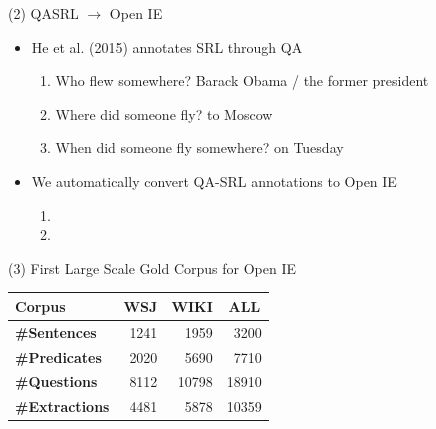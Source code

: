 \documentclass[final]{beamer}
\newcommand{\commonvspace}[0]{\vspace{1cm}}
\begin{document}
\begin{frame}{}
\begin{textblock}{39}
\begin{block}{(2) QASRL $\rightarrow$ Open IE}
  \begin{itemize}
        \setlength\itemsep{1em}
  \item He et al. (2015) annotates \alert{SRL} through QA
    \\ 
    \begin{enumerate}
    \item Who flew somewhere? \alert{Barack Obama} / \alert{the former president}
    \item Where did someone fly?  \alert{to Moscow}
    \item When did someone fly somewhere? \alert{on Tuesday}
    \end{enumerate}
  \item We \alert{automatically} convert QA-SRL annotations to Open IE
    \begin{enumerate}
    \item {}
    \item {}
    \end{enumerate}
  \end{itemize}
\end{block}

\commonvspace
\vspace{1.18cm}

\begin{block}{(3) First Large Scale Gold Corpus for Open IE}
  \begin{table}
    \begin{tabular}{lrrr}
      \hline
      \textbf{Corpus}        & \multicolumn{1}{c}{\textbf{WSJ}} & \multicolumn{1}{c}{\textbf{WIKI}} & \multicolumn{1}{c}{\textbf{ALL}} \\ \hline
      \textbf{\#Sentences}   & 1241                              & 1959                               & 3200                              \\ 
      \textbf{\#Predicates}  & 2020                              & 5690                               & 7710                              \\ 
      \textbf{\#Questions}   & 8112                              & 10798                              & 18910                             \\ 
      \textbf{\#Extractions} & 4481                     & 5878                      & 10359                    \\ \hline
    \end{tabular}
    \label{tab:cstats}
  \end{table}
\end{block}


\end{textblock}
\end{frame}
\end{document}
